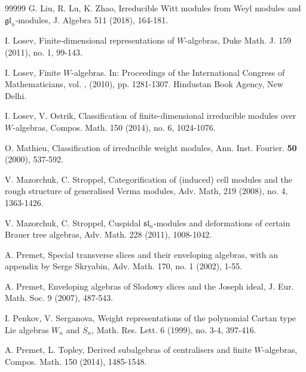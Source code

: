 \documentclass[12pt,a4paper]{amsart}
\numberwithin{equation}{section}
\def\mh{\mathfrak{h}}
\def\sl{\mathfrak{sl}}
\def\gl{\mathfrak{gl}}
\begin{document}
\begin{thebibliography}{99999}
 G. Liu, R. Lu, K. Zhao, Irreducible Witt modules from Weyl modules and $\gl_n$-modules, J.
Algebra 511 (2018), 164-181.

 I. Losev, Finite-dimensional representations of $W$-algebras, Duke Math. J. 159 (2011), no. 1, 99-143.

 I. Losev, Finite $W$-algebras. In: Proceedings of the International Congress of Mathematicians, vol. \uppercase\expandafter{},
(2010), pp. 1281-1307. Hindustan Book Agency, New Delhi.

    I. Losev, V. Ostrik, Classification of finite-dimensional irreducible modules over $W$-algebras, Compos. Math. 150 (2014), no. 6, 1024-1076.


 O. Mathieu, Classification of irreducible weight modules, Ann. Inst. Fourier. {\bf 50}  (2000),  537-592.


  V. Mazorchuk, C. Stroppel, Categorification of (induced) cell modules and the rough structure of generalised Verma modules, Adv. Math,
219  (2008), no. 4, 1363-1426.

     V. Mazorchuk, C. Stroppel, Cuspidal $\sl_n$-modules and deformations of certain Brauer tree algebras, Adv. Math. 228 (2011), 1008-1042.


%

  A. Premet, Special transverse slices and their enveloping algebras, with an appendix by Serge Skryabin, Adv. Math. 170, no. 1 (2002), 1-55.


 A. Premet, Enveloping algebras of Slodowy slices and the Joseph ideal, J. Eur. Math. Soc.
9 (2007), 487-543.

  I. Penkov, V. Serganova, Weight representations of the polynomial Cartan type Lie algebras $W_n$ and $\overline{S}_n$, Math. Res. Lett. 6 (1999), no. 3-4, 397-416.

 A. Premet, L. Topley, Derived subalgebras of centralisers and finite $W$-algebras, Compos. Math. 150 (2014), 1485-1548.



\end{thebibliography}
\end{document}
